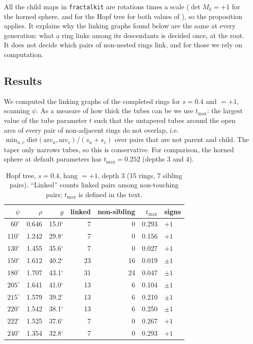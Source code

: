 \documentclass[11pt,a4paper]{article}
\theoremstyle{remark}
\newcommand{\code}[1]{\texttt{#1}}
\begin{document}
All the child maps in \code{fractalkit} are rotations times a scale ($\det M_k=+1$ for the horned sphere, and for the Hopf tree for both values of ), so the proposition applies.  It explains why the linking graphs found below are the same at every generation: what a ring links among its descendants is decided once, at the root.  It does not decide which pairs of non-nested rings link, and for those we rely on computation.

\subsection{Results}

We computed the linking graphs of the completed rings for $s=0.4$ and $=+1$, scanning $\psi$.  As a measure of how thick the tubes can be we use $t_{\max}$: the largest value of the tube parameter $t$ such that the untapered tubes around the open arcs of every pair of non-adjacent rings do not overlap, i.e.\
$\min_{u,v}\mathrm{dist}(\text{arc}_u,\text{arc}_v)/(s_u+s_v)$ over pairs that are not parent and child.  The taper only narrows tubes, so this is conservative.  For comparison, the horned sphere at default parameters has $t_{\max}=0.252$ (depths 3 and 4).

\begin{table}[t]
\centering\small
\begin{tabular}{@{}rrrrrrl@{}}
\toprule
$\psi$ & $\rho$ & $g$ & linked & non-sibling & $t_{\max}$ & signs \\ \midrule
$60^\circ$  & 0.646 & 15.0$^\circ$ & 7  & 0  & 0.293 & $+1$ \\
$110^\circ$ & 1.242 & 29.8$^\circ$ & 7  & 0  & 0.156 & $+1$ \\
$130^\circ$ & 1.455 & 35.6$^\circ$ & 7  & 0  & 0.027 & $+1$ \\
$150^\circ$ & 1.612 & 40.2$^\circ$ & 23 & 16 & 0.019 & $\pm1$ \\
$180^\circ$ & 1.707 & 43.1$^\circ$ & 31 & 24 & 0.047 & $\pm1$ \\
$205^\circ$ & 1.641 & 41.0$^\circ$ & 13 & 6  & 0.104 & $\pm1$ \\
$215^\circ$ & 1.579 & 39.2$^\circ$ & 13 & 6  & 0.210 & $\pm1$ \\
$220^\circ$ & 1.542 & 38.1$^\circ$ & 13 & 6  & 0.250 & $\pm1$ \\
$222^\circ$ & 1.525 & 37.6$^\circ$ & 7  & 0  & 0.267 & $+1$ \\
$240^\circ$ & 1.354 & 32.8$^\circ$ & 7  & 0  & 0.293 & $+1$ \\ \bottomrule
\end{tabular}
\caption{Hopf tree, $s=0.4$, hang $=+1$, depth 3 (15 rings, 7 sibling pairs).  ``Linked'' counts linked pairs among non-touching pairs; $t_{\max}$ is defined in the text.}
\label{tab:regimes}
\end{table}
\end{document}
